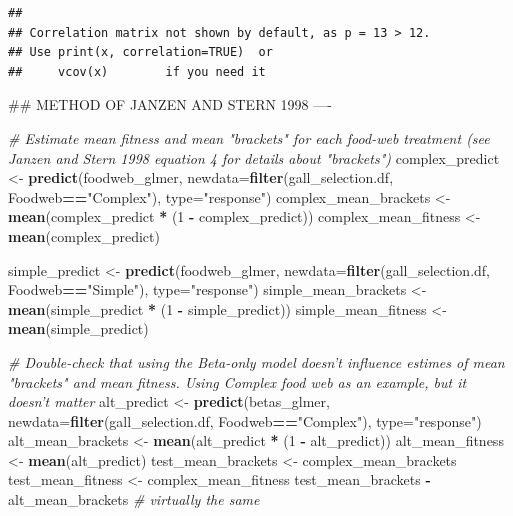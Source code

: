 \documentclass[]{elsarticle} %
\newenvironment{Shaded}{\begin{snugshade}}{\end{snugshade}}
\newcommand{\KeywordTok}[1]{\textcolor[rgb]{0.13,0.29,0.53}{\textbf{#1}}}
\newcommand{\DataTypeTok}[1]{\textcolor[rgb]{0.13,0.29,0.53}{#1}}
\newcommand{\DecValTok}[1]{\textcolor[rgb]{0.00,0.00,0.81}{#1}}
\newcommand{\StringTok}[1]{\textcolor[rgb]{0.31,0.60,0.02}{#1}}
\newcommand{\CommentTok}[1]{\textcolor[rgb]{0.56,0.35,0.01}{\textit{#1}}}
\newcommand{\OperatorTok}[1]{\textcolor[rgb]{0.81,0.36,0.00}{\textbf{#1}}}
\newcommand{\NormalTok}[1]{#1}
\begin{document}
\begin{verbatim}
## 
## Correlation matrix not shown by default, as p = 13 > 12.
## Use print(x, correlation=TRUE)  or
##     vcov(x)        if you need it
\end{verbatim}

\begin{Shaded}
\begin{Highlighting}[]
\NormalTok{## METHOD OF JANZEN AND STERN 1998 ----}

\CommentTok{# Estimate mean fitness and mean "brackets" for each food-web treatment (see Janzen and Stern 1998 equation 4 for details about "brackets")}
\NormalTok{complex_predict <-}\StringTok{ }\KeywordTok{predict}\NormalTok{(foodweb_glmer, }\DataTypeTok{newdata=}\KeywordTok{filter}\NormalTok{(gall_selection.df, Foodweb}\OperatorTok{==}\StringTok{"Complex"}\NormalTok{), }\DataTypeTok{type=}\StringTok{"response"}\NormalTok{)}
\NormalTok{complex_mean_brackets <-}\StringTok{ }\KeywordTok{mean}\NormalTok{(complex_predict }\OperatorTok{*}\StringTok{ }\NormalTok{(}\DecValTok{1} \OperatorTok{-}\StringTok{ }\NormalTok{complex_predict))}
\NormalTok{complex_mean_fitness <-}\StringTok{ }\KeywordTok{mean}\NormalTok{(complex_predict)}

\NormalTok{simple_predict <-}\StringTok{ }\KeywordTok{predict}\NormalTok{(foodweb_glmer, }\DataTypeTok{newdata=}\KeywordTok{filter}\NormalTok{(gall_selection.df, Foodweb}\OperatorTok{==}\StringTok{"Simple"}\NormalTok{), }\DataTypeTok{type=}\StringTok{"response"}\NormalTok{)}
\NormalTok{simple_mean_brackets <-}\StringTok{ }\KeywordTok{mean}\NormalTok{(simple_predict }\OperatorTok{*}\StringTok{ }\NormalTok{(}\DecValTok{1} \OperatorTok{-}\StringTok{ }\NormalTok{simple_predict))}
\NormalTok{simple_mean_fitness <-}\StringTok{ }\KeywordTok{mean}\NormalTok{(simple_predict)}

\CommentTok{# Double-check that using the Beta-only model doesn't influence estimes of mean "brackets" and mean fitness. Using Complex food web as an example, but it doesn't matter }
\NormalTok{alt_predict <-}\StringTok{ }\KeywordTok{predict}\NormalTok{(betas_glmer, }\DataTypeTok{newdata=}\KeywordTok{filter}\NormalTok{(gall_selection.df, Foodweb}\OperatorTok{==}\StringTok{"Complex"}\NormalTok{), }\DataTypeTok{type=}\StringTok{"response"}\NormalTok{)}
\NormalTok{alt_mean_brackets <-}\StringTok{ }\KeywordTok{mean}\NormalTok{(alt_predict }\OperatorTok{*}\StringTok{ }\NormalTok{(}\DecValTok{1} \OperatorTok{-}\StringTok{ }\NormalTok{alt_predict))}
\NormalTok{alt_mean_fitness <-}\StringTok{ }\KeywordTok{mean}\NormalTok{(alt_predict)}
\NormalTok{test_mean_brackets <-}\StringTok{ }\NormalTok{complex_mean_brackets}
\NormalTok{test_mean_fitness <-}\StringTok{ }\NormalTok{complex_mean_fitness}
\NormalTok{test_mean_brackets }\OperatorTok{-}\StringTok{ }\NormalTok{alt_mean_brackets }\CommentTok{# virtually the same}
\end{Highlighting}
\end{Shaded}
\end{document}
